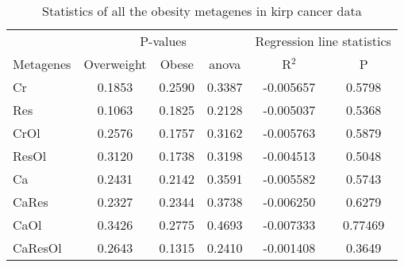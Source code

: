 \begin{appendices}
\begin{table}[htpb]
	\centering
	\caption{Statistics of all the obesity metagenes in \gls{kirp} cancer data}
	\label{tab:degmetakirp}
	\begin{threeparttable}
		\begin{tabular}{lccccc}
			& \multicolumn{3}{c}{ P-values} & \multicolumn{2}{c}{ Regression line statistics}\\
			\cmidrule(r){2-4} \cmidrule(r){5-6}
			Metagenes &  Overweight &  Obese &  \gls{anova} &  R$^2$ &  P \\
			\hline
			\hline
			\rule{0pt}{2.25ex}Cr      & 0.1853                      & 0.2590  & 0.3387             & -0.005657  & 0.5798              \\
            Res     & 0.1063                      & 0.1825  & 0.2128             & -0.005037  & 0.5368              \\
            CrOl    & 0.2576                      & 0.1757  & 0.3162             & -0.005763  & 0.5879              \\
            ResOl   & 0.3120                      & 0.1738  & 0.3198             & -0.004513  & 0.5048              \\
            Ca      & 0.2431                      & 0.2142  & 0.3591             & -0.005582  & 0.5743              \\
            CaRes   & 0.2327                      & 0.2344  & 0.3738             & -0.006250  & 0.6279              \\
            CaOl    & 0.3426                      & 0.2775  & 0.4693             & -0.007333  & 0.77469             \\
            CaResOl & 0.2643                      & 0.1315  & 0.2410             & -0.001408  & 0.3649              \\
			\hline
			\hline
		\end{tabular}
	\end{threeparttable}
\end{table}


\end{appendices}
